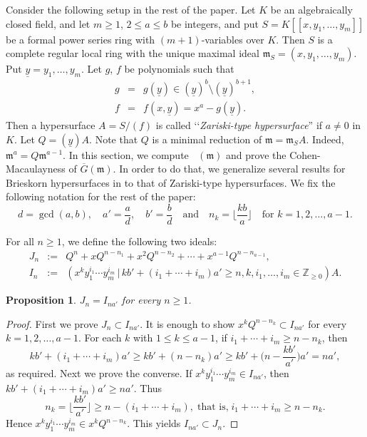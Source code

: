 \documentclass[12pt]{amsart}
\newtheorem{prop}[thm]{Proposition}
\theoremstyle{definition}
\theoremstyle{remark}
\numberwithin{equation}{section}
\newcommand{\m}{{\mathfrak m}}
\DeclareMathOperator{\br}{\bar r}
\begin{document}
\par 
Consider the following setup in the rest of the paper. 
Let $K$ be an algebraically closed field, and 
let $m \ge 1$, $2 \le a \le b$ be integers, 
and put $S=K[[x, y_1,\ldots, y_m]]$ be a formal power series ring 
with $(m+1)$-variables over $K$. 
Then $S$ is a complete regular local ring with 
the unique maximal ideal $\m_S =(x, y_1,\ldots,y_m)$. 
Put $\underline{y}=y_1,\ldots,y_m$.
Let $g$, $f$  be polynomials such that  
\begin{eqnarray*}
g &= & g(\underline{y}) \in (\underline{y})^b 
\setminus (\underline{y})^{b+1}, \\
f &=& f(x,\underline{y})=x^a-g(\underline{y}).
\end{eqnarray*}
Then a hypersurface $A=S/(f)$  
is called \lq\lq  {\it Zariski-type hypersurface}'' if $a \ne 0$ in $K$. 
Let $Q=(\underline{y})A$.   
Note that $Q$ is a minimal reduction of $\m=\m_SA$. 
Indeed, $\m^a=Q\m^{a-1}$. 
In this section, we compute $\br(\m)$ and prove the Cohen-Macaulayness of $\overline{G}(\m)$. 
In order to do that, we generalize several results for Brieskorn hypersurfaces in \cite[Section 3]{OWY2019} to that of Zariski-type hypersurfaces. 
We fix the following notation for the rest of the paper:
\[
d=\gcd(a,b), \quad a'=\frac{a}{d}, \quad b'=\frac{b}{d}
\quad 
\text{and} 
\quad 
n_k=\lfloor \frac{kb}{a} \rfloor \quad \text{for $k=1,2,\ldots,a-1$.}
\]
\par 
For all $n \ge 1$, we define the following two ideals:
\begin{eqnarray*}
J_n &:=& Q^n+xQ^{n-n_1}+x^2Q^{n-n_2} + \cdots + x^{a-1}
Q^{n-n_{a-1}}, \\
I_n &:=& \left(x^k y_1^{i_1}\cdots y_m^{i_m} \,\big|\,kb'+(i_1+\cdots+i_m)a' \ge n, k,i_1, \ldots, i_m \in \mathbb{Z}_{\geq 0} \right)A.
\end{eqnarray*}

\begin{prop} \label{JNvsIN}
$J_n=I_{na'}$ for every $n \ge 1$. 
\end{prop}

\begin{proof}
First we prove $J_n \subset I_{na'}$. 
It is enough to show $x^kQ^{n-n_k} \subset I_{na'}$ for every $k=1,2,\ldots,a-1$. 
For each $k$ with $1 \le k \le a-1$, if $i_1+\cdots +i_m \ge n-n_k$, 
then 
\[
kb'+(i_1+\cdots +i_m)a' 
 \ge  kb'+(n-n_k)a' 
 \ge  kb'+\big(n-\frac{kb'}{a'}\big)a'=na',  
\]
as required. Next we prove the converse. 
If $x^ky_1^{i_1}\cdots y_m^{i_m} \in I_{na'}$, then 
$kb'+(i_1+\cdots+i_m)a' \ge na'$. 
Thus
\[
n_k=\lfloor \frac{kb'}{a'} \rfloor \ge n-(i_1+\cdots+i_m), 
\;\text{that is,}\; 
i_1+\cdots+i_m \ge n-n_k. 
\]
Hence $x^ky_1^{i_1}\cdots y_m^{i_m} \in x^k Q^{n-n_k}$. 
This yields $I_{na'} \subset J_n$. 
\end{proof}
\end{document}
